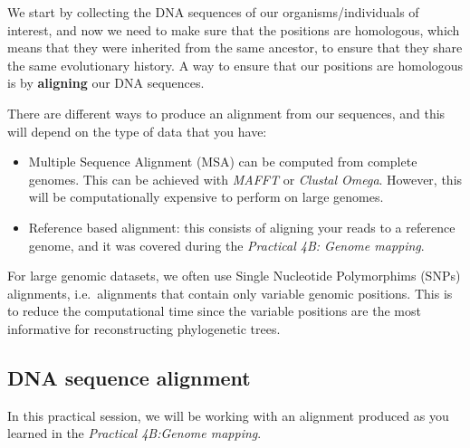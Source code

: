 \documentclass[
  letterpaper,
]{book}
\providecommand{\tightlist}{%
  \setlength{\itemsep}{0pt}\setlength{\parskip}{0pt}}\usepackage{longtable,booktabs,array}
\begin{document}
We start by collecting the DNA sequences of our organisms/individuals of
interest, and now we need to make sure that the positions are
homologous, which means that they were inherited from the same ancestor,
to ensure that they share the same evolutionary history. A way to ensure
that our positions are homologous is by \textbf{aligning} our DNA
sequences.

There are different ways to produce an alignment from our sequences, and
this will depend on the type of data that you have:

\begin{itemize}
\tightlist
\item
  Multiple Sequence Alignment (MSA) can be computed from complete
  genomes. This can be achieved with \emph{MAFFT} or \emph{Clustal
  Omega}. However, this will be computationally expensive to perform on
  large genomes.
\item
  Reference based alignment: this consists of aligning your reads to a
  reference genome, and it was covered during the \emph{Practical 4B:
  Genome mapping}.
\end{itemize}

\begin{tcolorbox}[enhanced jigsaw, opacitybacktitle=0.6, bottomtitle=1mm, opacityback=0, colback=white, coltitle=black, leftrule=.75mm, toprule=.15mm, title=\textcolor{quarto-callout-note-color}{\faInfo}\hspace{0.5em}{Note}, colframe=quarto-callout-note-color-frame, toptitle=1mm, arc=.35mm, left=2mm, titlerule=0mm, breakable, rightrule=.15mm, bottomrule=.15mm, colbacktitle=quarto-callout-note-color!10!white]

For large genomic datasets, we often use Single Nucleotide Polymorphims
(SNPs) alignments, i.e.~alignments that contain only variable genomic
positions. This is to reduce the computational time since the variable
positions are the most informative for reconstructing phylogenetic
trees.

\end{tcolorbox}

\hypertarget{dna-sequence-alignment}{%
\subsection{DNA sequence alignment}\label{dna-sequence-alignment}}

In this practical session, we will be working with an alignment produced
as you learned in the \emph{Practical 4B:Genome mapping}.
\end{document}
